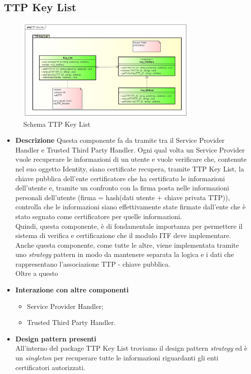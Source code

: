 \subsection{TTP Key List}
\begin{figure}[!h]
	\centering
	\includegraphics[width=0.8\textwidth]{immagini/ttpkeylist}
	\caption{Schema TTP Key List}
\end{figure}
\begin{itemize}
	\item \textbf{Descrizione}
	Questa componente fa da tramite tra il Service Provider Handler e Trusted Third Party Handler.
	Ogni qual volta un Service Provider vuole recuperare le informazioni di un utente e vuole verificare che, contenute nel suo oggetto Identity, siano certificate recupera, tramite TTP Key List, la chiave pubblica dell'ente certificatore che ha certificato le informazioni dell'utente e, tramite un confronto con la firma posta nelle informazioni personali dell'utente (firma = hash(dati utente + chiave privata \gls{TTP})), controlla che le informazioni siano effettivamente state firmate dall'ente che è stato segnato come certificatore per quelle informazioni.\\
	Quindi, questa componente, è di fondamentale importanza per permettere il sistema di verifica e certificazione che il modulo \gls{ITF} deve implementare.\\
	Anche questa componente, come tutte le altre, viene implementata tramite uno \textit{strategy} pattern in modo da mantenere separata la logica e i dati che rappresentano l'associazione \gls{TTP} - chiave pubblica.\\
	Oltre a questo
	\item \textbf{Interazione con altre componenti}
	\begin{itemize}
		\item Service Provider Handler;
		\item Trusted Third Party Handler.
	\end{itemize}
	\item \textbf{Design pattern presenti}\\
	All'interno del package TTP Key List troviamo il design pattern \textit{strategy} ed è un \textit{singleton} per recuperare tutte le informazioni riguardanti gli enti certificatori autorizzati.
\end{itemize}
